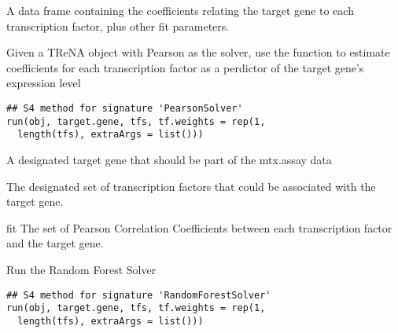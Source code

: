 \documentclass[a4paper]{book}
\begin{document}
%
\begin{Value}
A data frame containing the coefficients relating the target gene to each transcription factor, plus other fit parameters.
\end{Value}
%
\begin{SeeAlso}\relax
{}
\end{SeeAlso}
%
\begin{Description}\relax
Given a TReNA object with Pearson as the solver, use the  function to
estimate coefficients for each transcription factor as a perdictor of the target gene's expression level
\end{Description}
%
\begin{Usage}
\begin{verbatim}
## S4 method for signature 'PearsonSolver'
run(obj, target.gene, tfs, tf.weights = rep(1,
  length(tfs), extraArgs = list()))
\end{verbatim}
\end{Usage}
%
\begin{Arguments}
\begin{ldescription}
\item[\code{target.gene}] A designated target gene that should be part of the mtx.assay data

\item[\code{tfs}] The designated set of transcription factors that could be associated with the target gene.
\end{ldescription}
\end{Arguments}
%
\begin{Value}
fit The set of Pearson Correlation Coefficients between each transcription factor and the target gene.
\end{Value}
%
\begin{SeeAlso}\relax
{}
\end{SeeAlso}
%
\begin{Description}\relax
Run the Random Forest Solver
\end{Description}
%
\begin{Usage}
\begin{verbatim}
## S4 method for signature 'RandomForestSolver'
run(obj, target.gene, tfs, tf.weights = rep(1,
  length(tfs), extraArgs = list()))
\end{verbatim}
\end{Usage}
\end{document}
